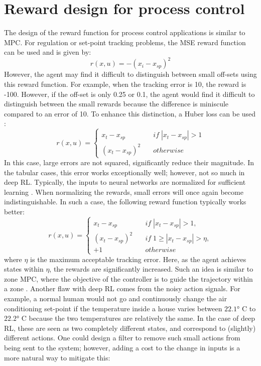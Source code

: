 \section{Reward design for process control}
The design of the reward function for process control applications is similar to MPC.  For regulation or set-point tracking problems, the MSE reward function can be used and is given by:
\begin{equation}
    r(x, u) = -(x_i - x_{sp})^2
\end{equation}
However, the agent may find it difficult to distinguish between small off-sets using this reward function.  For example, when the tracking error is 10, the reward is -100.  However, if the off-set is only 0.25 or 0.1, the agent would find it difficult to distinguish between the small rewards because the difference is miniscule compared to an error of 10.  To enhance this distinction, a Huber loss can be used \cite{huber}:
\begin{equation*}
    r(x, u) = \begin{cases}
    x_t - x_{sp} & \quad if \; |x_t - x_{sp}| > 1 \\
    (x_t - x_{sp})^2 & \quad otherwise
    \end{cases}
\end{equation*}
In this case, large errors are not squared, significantly reduce their magnitude.  In the tabular cases, this error works exceptionally well; however, not so much in deep RL.  Typically, the inputs to neural networks are normalized for sufficient learning \cite{NN}.  When normalizing the rewards, small errors will once again become indistinguishable.  In such a case, the following reward function typically works better:
\begin{equation*}
    r(x, u) = \begin{cases}
    x_t - x_{sp} & \quad if \; |x_t - x_{sp}| > 1, \\
    (x_t - x_{sp})^2 & \quad if \; 1 \geq |x_t - x_{sp}| > \eta, \\
    +1 & \quad otherwise
    \end{cases}
\end{equation*}
where $\eta$ is the maximum acceptable tracking error. Here, as the agent achieves states within $\eta$, the rewards are significantly increased.  Such an idea is similar to zone MPC, where the objective of the controller is to guide the trajectory within a zone \cite{zone_mpc}. Another flaw with deep RL comes from the noisy action signals.  For example, a normal human would not go and continuously change the air conditioning set-point if the temperature inside a house varies between $\ang{22.1}$ C to $\ang{22.2}$ C because the two temperatures are relatively the same.  In the case of deep RL, these are seen as two completely different states, and correspond to (slightly) different actions.  One could design a filter to remove such small actions from being sent to the system; however, adding a cost to the change in inputs is a more natural way to mitigate this:
